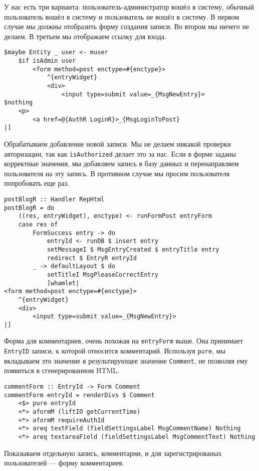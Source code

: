 У нас есть три варианта: пользователь-администратор вошёл в систему, обычный пользователь вошёл в систему и пользователь не вошёл в систему. В первом случае мы должны отобразить форму создания записи. Во втором мы ничего не делаем. В третьем мы отображаем ссылку для входа. 
 
\begin{lstlisting}
$maybe Entity _ user <- muser
    $if isAdmin user
        <form method=post enctype=#{enctype}>
            ^{entryWidget}
            <div>
                <input type=submit value=_{MsgNewEntry}>
$nothing
    <p>
        <a href=@{AuthR LoginR}>_{MsgLoginToPost}
|]
\end{lstlisting}%
 
Обрабатываем добавление новой записи. Мы не делаем никакой проверки авторизации, так как \lstinline!isAuthorized! делает это за нас. Если в форме заданы корректные значения, мы добавляем запись в базу данных и перенаправляем пользователя на эту запись. В противном случае мы просим пользователя попробовать еще раз. 
 
\begin{lstlisting}
postBlogR :: Handler RepHtml
postBlogR = do
    ((res, entryWidget), enctype) <- runFormPost entryForm
    case res of
        FormSuccess entry -> do
            entryId <- runDB $ insert entry
            setMessageI $ MsgEntryCreated $ entryTitle entry
            redirect $ EntryR entryId
        _ -> defaultLayout $ do
            setTitleI MsgPleaseCorrectEntry
            [whamlet|
<form method=post enctype=#{enctype}>
    ^{entryWidget}
    <div>
        <input type=submit value=_{MsgNewEntry}>
|]
\end{lstlisting}%
 
Форма для комментариев, очень похожая на \lstinline!entryForm! выше. Она принимает \lstinline!EntryID! записи, к которой относится комментарий. Используя \lstinline!pure!, мы вкладываем это значение в результирующее значение \lstinline!Comment!, не позволяя ему появиться в сгенерированном HTML. 
 
\begin{lstlisting}
commentForm :: EntryId -> Form Comment
commentForm entryId = renderDivs $ Comment
    <$> pure entryId
    <*> aformM (liftIO getCurrentTime)
    <*> aformM requireAuthId
    <*> areq textField (fieldSettingsLabel MsgCommentName) Nothing
    <*> areq textareaField (fieldSettingsLabel MsgCommentText) Nothing
\end{lstlisting}
 
Показываем отдельную запись, комментарии, и для зарегистрированых пользователей --- форму комментариев.
 
